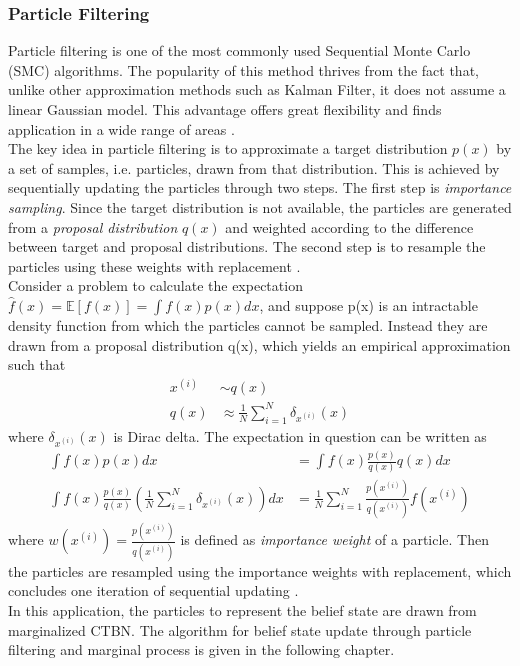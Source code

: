 \subsubsection{Particle Filtering}
Particle filtering is one of the most commonly used Sequential Monte Carlo (SMC) algorithms. The popularity of this method thrives from the fact that, unlike other approximation methods such as Kalman Filter, it does not assume a linear Gaussian model. This advantage offers great flexibility and finds application in a wide range of areas \cite{Doucet2009}. \\
The key idea in particle filtering is to approximate a target distribution $ p(x) $ by a set of samples, i.e. particles, drawn from that distribution. This is achieved by sequentially updating the particles through two steps. The first step is \textit{importance sampling}. Since the target distribution is not available, the particles are generated from a \textit{proposal distribution} $ q(x) $ and weighted according to the difference between target and proposal distributions. The second step is to resample the particles using these weights with replacement \cite{Godsill2019}. \\
Consider a problem to calculate the expectation $ \hat{f}(x) = \mathbb{E} \left[ f(x)\right] = \int f(x) p(x)dx $, and suppose p(x) is an intractable density function from which the particles cannot be sampled. Instead they are drawn from a proposal distribution q(x), which yields an empirical approximation such that
\begin{align*}
x^{(i)} & \sim q(x) \\
q(x) & \approx \frac{1}{N} \sum_{i=1}^{N} \delta_{x^{(i)}}(x)
\end{align*}
where $ \delta_{x^{(i)}}(x) $ is Dirac delta. The expectation in question can be written as
\begin{align*}
\int f(x) p(x)dx & = \int f(x) \frac{p(x)}{q(x)} q(x)dx\\
\int f(x) \frac{p(x)}{q(x)} \left( \frac{1}{N} \sum_{i=1}^{N} \delta_{x^{(i)}}(x)\right) dx & = \frac{1}{N} \sum_{i=1}^{N}\frac{p(x^{(i)})}{q(x^{(i)})} f(x^{(i)})
\end{align*}
where $ w(x^{(i)}) = \frac{p(x^{(i)})}{q(x^{(i)})} $ is defined as \textit{importance weight} of a particle. Then the particles are resampled using the importance weights with replacement, which concludes one iteration of sequential updating \cite{Godsill2019}.\\
In this application, the particles to represent the belief state are drawn from marginalized CTBN. The algorithm for belief state update through particle filtering and marginal process is given in the following chapter. %

